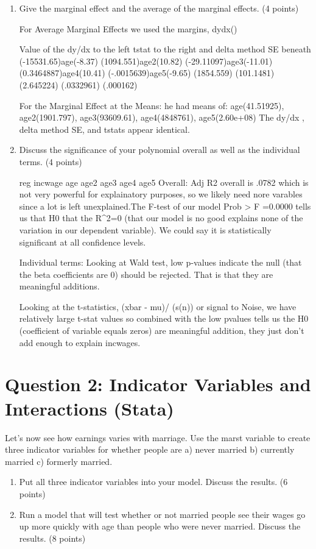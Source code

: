 \documentclass{article}
\begin{document}
\begin{enumerate}[label=\alph*]
\item  Give the marginal effect and the average of the marginal effects.  (4 points)

For Average Marginal Effects we used the margins, dydx()

Value of the dy/dx to the left tstat to the right and delta method SE beneath
(-15531.65)age(-8.37)     (1094.551)age2(10.82)    (-29.11097)age3(-11.01)    (0.3464887)age4(10.41)    (-.0015639)age5(-9.65)
        (1854.559)               (101.1481)                (2.645224)                 (.0332961)                (.000162)

For the Marginal Effect at the Means:
he had means of: age(41.51925), age2(1901.797), age3(93609.61), age4(4848761), age5(2.60e+08)
The dy/dx , delta method SE, and tstats appear identical.


\item  Discuss the significance of your polynomial overall as well as the individual terms.  (4 points)


reg incwage age age2 age3 age4 age5 Overall: Adj R2 overall is .0782 which is not very powerful for explainatory purposes, so we likely need nore varables since a lot is left unexplained.The F-test of our model Prob > F =0.0000 tells us that H0 that the R^2=0 (that our model is no good explains none of the variation in our dependent variable). We could say it is statistically significant at all confidence levels.

Individual terms: Looking at Wald test, low p-values indicate the null (that the beta coefficients are 0) should be rejected. That is that they are meaningful additions.

Looking at the t-statistics, (xbar - mu)/ (s\sqrt(n)) or signal to Noise, we have relatively large t-stat values so combined with the low pvalues tells us the H0 (coefficient of variable equals zeros) are meaningful addition, they just don't add enough to explain incwages.

\end{enumerate}

\section{Question 2:  Indicator Variables and Interactions  (Stata)}
Let’s now see how earnings varies with marriage. Use the marst variable to create
three indicator variables for whether people are a) never married b) currently married c) formerly married.

\begin{enumerate}[label=\alph*]
\item  Put all three indicator variables into your model. Discuss the results. (6 points)

\item Run a model that will test whether or not married people see their wages go up
more quickly with age than people who were never married. Discuss the results.
(8 points)

\end{enumerate}
\end{document}
